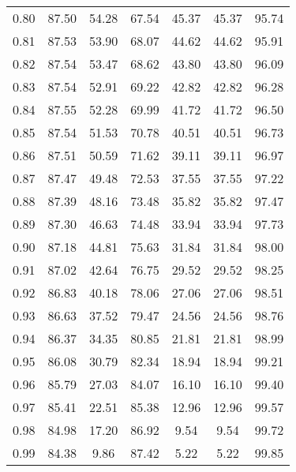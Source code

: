 \begin{tabular}{|c|c|c|c|c|c|c|}
      0.80 &     87.50 &     54.28 &      67.54 &   45.37 &      45.37 &         95.74 \\
      0.81 &     87.53 &     53.90 &      68.07 &   44.62 &      44.62 &         95.91 \\
      0.82 &     87.54 &     53.47 &      68.62 &   43.80 &      43.80 &         96.09 \\
      0.83 &     87.54 &     52.91 &      69.22 &   42.82 &      42.82 &         96.28 \\
      0.84 &     87.55 &     52.28 &      69.99 &   41.72 &      41.72 &         96.50 \\
      0.85 &     87.54 &     51.53 &      70.78 &   40.51 &      40.51 &         96.73 \\
      0.86 &     87.51 &     50.59 &      71.62 &   39.11 &      39.11 &         96.97 \\
      0.87 &     87.47 &     49.48 &      72.53 &   37.55 &      37.55 &         97.22 \\
      0.88 &     87.39 &     48.16 &      73.48 &   35.82 &      35.82 &         97.47 \\
      0.89 &     87.30 &     46.63 &      74.48 &   33.94 &      33.94 &         97.73 \\
      0.90 &     87.18 &     44.81 &      75.63 &   31.84 &      31.84 &         98.00 \\
      0.91 &     87.02 &     42.64 &      76.75 &   29.52 &      29.52 &         98.25 \\
      0.92 &     86.83 &     40.18 &      78.06 &   27.06 &      27.06 &         98.51 \\
      0.93 &     86.63 &     37.52 &      79.47 &   24.56 &      24.56 &         98.76 \\
      0.94 &     86.37 &     34.35 &      80.85 &   21.81 &      21.81 &         98.99 \\
      0.95 &     86.08 &     30.79 &      82.34 &   18.94 &      18.94 &         99.21 \\
      0.96 &     85.79 &     27.03 &      84.07 &   16.10 &      16.10 &         99.40 \\
      0.97 &     85.41 &     22.51 &      85.38 &   12.96 &      12.96 &         99.57 \\
      0.98 &     84.98 &     17.20 &      86.92 &    9.54 &       9.54 &         99.72 \\
      0.99 &     84.38 &      9.86 &      87.42 &    5.22 &       5.22 &         99.85 \\
\bottomrule
\end{tabular}
